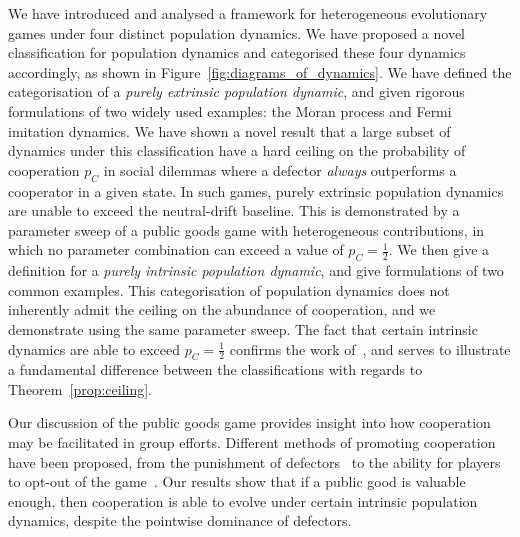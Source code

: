 \documentclass{article}
\begin{document}
We have introduced and analysed a framework for heterogeneous evolutionary games
under four distinct population dynamics. We have proposed a novel classification
for population dynamics and categorised these four dynamics accordingly, as
shown in Figure~\ref{fig:diagrams_of_dynamics}. We have defined the
categorisation of a \emph{purely extrinsic population dynamic}, and given
rigorous formulations of two widely used examples: the Moran process and Fermi
imitation dynamics.  We have shown a novel result that a large subset of
dynamics under this classification have a hard ceiling on the probability of
cooperation \(p_C\) in social dilemmas where a defector \emph{always}
outperforms a cooperator in a given state. In such games, purely extrinsic
population dynamics are unable to exceed the neutral-drift baseline. This is
demonstrated by a parameter sweep of a public goods game with heterogeneous
contributions, in which no parameter combination can exceed a value of \(p_C =
\frac{1}{2}\). We then give a definition for a \emph{purely intrinsic population
dynamic}, and give formulations of two common examples. This categorisation of
population dynamics does not inherently admit the ceiling on the abundance of
cooperation, and we demonstrate using the same parameter sweep. The fact that
certain intrinsic dynamics are able to exceed \(p_C = \frac{1}{2}\) confirms the
work of~\cite{Couto2023, Wang2025}, and serves to illustrate a fundamental
difference between the classifications with regards to
Theorem~\ref{prop:ceiling}.

Our discussion of the public goods game provides insight into how cooperation
may be facilitated in group efforts. Different methods of promoting cooperation
have been proposed, from the punishment of defectors~\cite{deng_rare_2012} to
the ability for players to opt-out of the
game~\cite{g10010001,hauert2002volunteering}. Our results show that if a public
good is valuable enough, then cooperation is able to evolve under certain
intrinsic population dynamics, despite the pointwise dominance of defectors.
\end{document}
